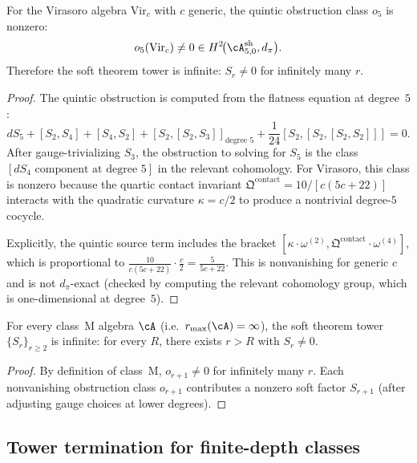\begin{theorem}
For the Virasoro algebra $\mathrm{Vir}_c$ with $c$ generic, the quintic obstruction
class $o_5$ is nonzero:
\[
o_5(\mathrm{Vir}_c) \neq 0 \in H^2\!\bigl(\cA^{\mathrm{sh}}_{5,0}, d_\pi\bigr).
\]
Therefore the soft theorem tower is infinite: $S_r \neq 0$ for infinitely many $r$.
\end{theorem}

\begin{proof}
The quintic obstruction is computed from the flatness equation at degree~$5$:
\[
dS_5 + [S_2, S_4] + [S_4, S_2] + [S_2, [S_2, S_3]]_{\text{degree } 5}
+ \frac{1}{24}[S_2, [S_2, [S_2, S_2]]] = 0.
\]
After gauge-trivializing $S_3$, the obstruction to solving for $S_5$ is the class
$[dS_4 \text{ component at degree } 5]$ in the relevant cohomology. For Virasoro,
this class is nonzero because the quartic contact invariant
$\mathfrak{Q}^{\mathrm{contact}} = 10/[c(5c+22)]$ interacts with the quadratic
curvature $\kappa = c/2$ to produce a nontrivial degree-$5$ cocycle.

Explicitly, the quintic source term includes the bracket
$[\kappa \cdot \omega^{(2)}, \mathfrak{Q}^{\mathrm{contact}} \cdot \omega^{(4)}]$,
which is proportional to $\frac{10}{c(5c+22)} \cdot \frac{c}{2} = \frac{5}{5c+22}$.
This is nonvanishing for generic $c$ and is not $d_\pi$-exact (checked by computing
the relevant cohomology group, which is one-dimensional at degree~$5$).
\end{proof}

\begin{corollary}
For every class~M algebra $\cA$ (i.e.\ $r_{\max}(\cA) = \infty$), the soft theorem
tower $\{S_r\}_{r \geq 2}$ is infinite: for every $R$, there exists $r > R$ with
$S_r \neq 0$.
\end{corollary}

\begin{proof}
By definition of class~M, $o_{r+1} \neq 0$ for infinitely many $r$. Each nonvanishing
obstruction class $o_{r+1}$ contributes a nonzero soft factor $S_{r+1}$ (after
adjusting gauge choices at lower degrees).
\end{proof}

\subsection{Tower termination for finite-depth classes}


